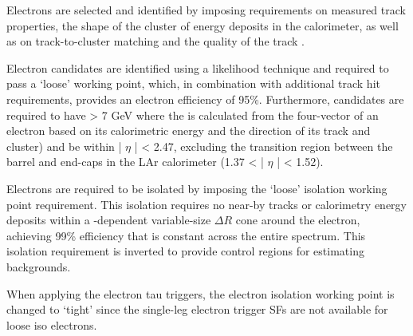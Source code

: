 Electrons are selected and identified by imposing requirements on measured track properties, the shape
of the cluster of energy deposits in the calorimeter, as well as on track-to-cluster matching and the
quality of the track \cite{PERF-2013-03}. 

Electron candidates are identified using a likelihood technique and required to
pass a `loose' working point, which, in combination with additional track hit requirements, provides an
electron efficiency of 95\%. Furthermore, candidates are required to have \pT > 7 GeV where the \pT is
calculated from the four-vector of an electron based on its calorimetric energy and the direction of its track
and cluster) and be within | $\eta$ | < 2.47, excluding the transition region 
between the barrel and end-caps in the LAr calorimeter (1.37 < | $\eta$ | < 1.52).

Electrons are required to be isolated by imposing the `loose' isolation
working point requirement. This isolation requires no near-by tracks or calorimetry energy deposits within
a \pT-dependent variable-size $\Delta{R}$ cone around the electron, achieving 99\% efficiency that is constant across
the entire \pT spectrum. This isolation requirement is inverted to provide control regions for estimating
backgrounds.

When applying the electron tau triggers, the electron isolation working point is changed to `tight'
since the single-leg electron trigger SFs are not available for loose iso electrons.